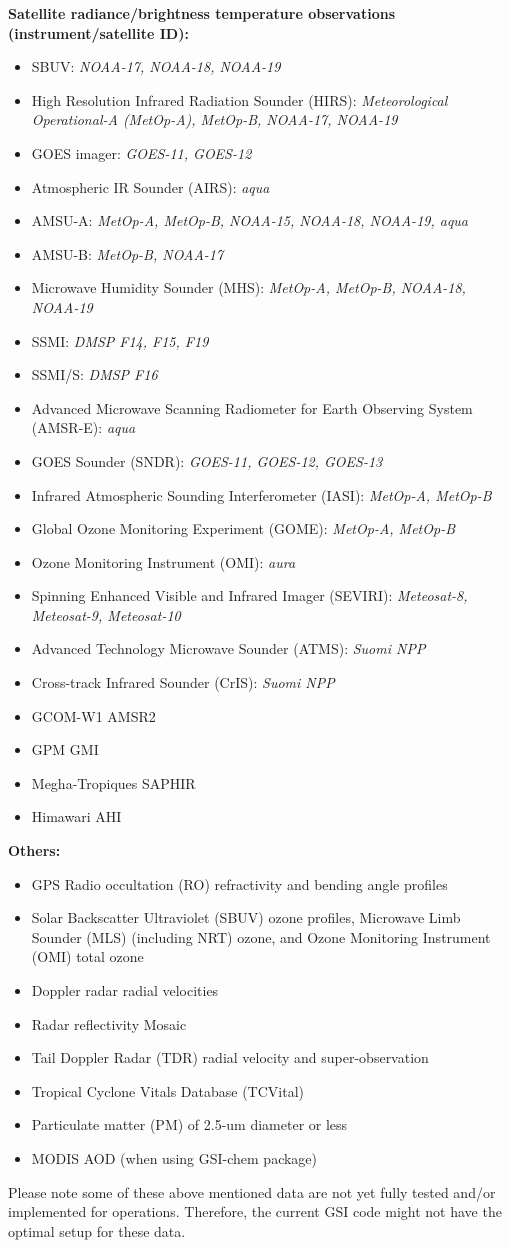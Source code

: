 \textbf{Satellite radiance/brightness temperature observations (instrument/satellite ID):}
\begin{itemize}
\item SBUV: \textit {NOAA-17, NOAA-18, NOAA-19}
\item High Resolution Infrared Radiation Sounder (HIRS): \textit {Meteorological Operational-A (MetOp-A), MetOp-B, NOAA-17, NOAA-19}
\item GOES imager: \textit {GOES-11, GOES-12}
\item Atmospheric IR Sounder (AIRS): \textit {aqua}
\item AMSU-A: \textit {MetOp-A, MetOp-B, NOAA-15, NOAA-18, NOAA-19, aqua} 
\item AMSU-B: \textit {MetOp-B, NOAA-17}
\item Microwave Humidity Sounder (MHS): \textit {MetOp-A, MetOp-B, NOAA-18, NOAA-19}
\item SSMI: \textit {DMSP F14, F15, F19}
\item SSMI/S: \textit {DMSP F16}
\item Advanced Microwave Scanning Radiometer for Earth Observing System (AMSR-E): \textit {aqua}
\item GOES Sounder (SNDR): \textit {GOES-11, GOES-12, GOES-13}
\item Infrared Atmospheric Sounding Interferometer (IASI): \textit {MetOp-A, MetOp-B}
\item Global Ozone Monitoring Experiment (GOME): \textit {MetOp-A, MetOp-B}
\item Ozone Monitoring Instrument (OMI): \textit {aura}
\item Spinning Enhanced Visible and Infrared Imager (SEVIRI): \textit {Meteosat-8, Meteosat-9, Meteosat-10}
\item Advanced Technology Microwave Sounder (ATMS): \textit {Suomi NPP}
\item Cross-track Infrared Sounder (CrIS): \textit {Suomi NPP}
\item GCOM-W1 AMSR2 
\item GPM GMI
\item Megha-Tropiques SAPHIR 
\item Himawari AHI
\end{itemize}

\textbf{Others:}
\begin{itemize}
\item GPS Radio occultation (RO) refractivity and bending angle profiles
\item Solar Backscatter Ultraviolet (SBUV) ozone profiles, Microwave Limb Sounder (MLS) (including NRT) ozone, and Ozone Monitoring Instrument (OMI) total ozone
\item Doppler  radar radial velocities
\item Radar reflectivity Mosaic
\item Tail Doppler Radar (TDR) radial velocity and super-observation
\item Tropical Cyclone Vitals Database (TCVital)
\item Particulate matter (PM) of 2.5-um diameter or less
\item MODIS AOD (when using GSI-chem package)
\end{itemize}

Please note some of these above mentioned data are not yet fully tested and/or implemented for operations. Therefore, the current GSI code might not have the optimal setup for these data. 







